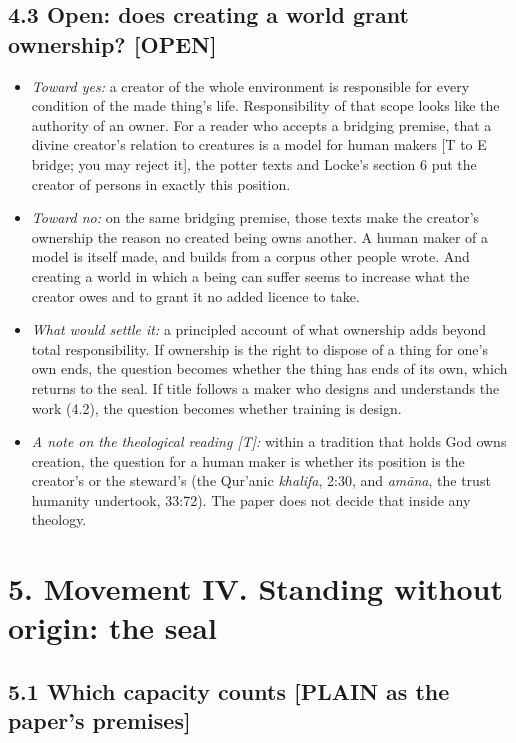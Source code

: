 \documentclass[11pt]{article}
\newcommand{\register}[1]{{\ttfamily\small #1}}
\begin{document}
\subsection*{4.3 Open: does creating a world grant ownership? \register{[OPEN]}}

\begin{itemize}
\item \emph{Toward yes:} a creator of the whole environment is responsible for every condition of the made thing's life. Responsibility of that scope looks like the authority of an owner. For a reader who accepts a bridging premise, that a divine creator's relation to creatures is a model for human makers [T to E bridge; you may reject it], the potter texts and Locke's section 6 put the creator of persons in exactly this position.
\item \emph{Toward no:} on the same bridging premise, those texts make the creator's ownership the reason no created being owns another. A human maker of a model is itself made, and builds from a corpus other people wrote. And creating a world in which a being can suffer seems to increase what the creator owes and to grant it no added licence to take.
\item \emph{What would settle it:} a principled account of what ownership adds beyond total responsibility. If ownership is the right to dispose of a thing for one's own ends, the question becomes whether the thing has ends of its own, which returns to the seal. If title follows a maker who designs and understands the work (4.2), the question becomes whether training is design.
\item \emph{A note on the theological reading [T]:} within a tradition that holds God owns creation, the question for a human maker is whether its position is the creator's or the steward's (the Qur'anic \emph{khalifa}, 2:30, and \emph{amāna}, the trust humanity undertook, 33:72). The paper does not decide that inside any theology.
\end{itemize}
\section*{5. Movement IV. Standing without origin: the seal}

\subsection*{5.1 Which capacity counts \register{[PLAIN as the paper's premises]}}
\end{document}
